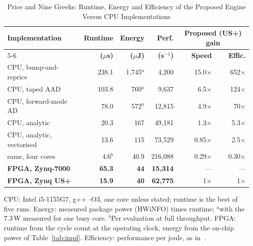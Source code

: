 \documentclass[conference]{IEEEtran}
\begin{document}
\begin{table}[!t]
\centering
\caption{Price and Nine Greeks: Runtime, Energy and Efficiency of the Proposed Engine Versus CPU Implementations}
\label{tab:cpu}
\footnotesize
\setlength{\tabcolsep}{1.8pt}
\begin{tabular}{@{}lrrrrr@{}}
\toprule
\textbf{Implementation} & \textbf{Runtime} & \textbf{Energy} & \textbf{Perf.} & \multicolumn{2}{c}{\textbf{Proposed (US+) gain}}\\
\cmidrule(l){5-6}
& \textbf{($\mu$s)} & \textbf{($\mu$J)} & \textbf{(s$^{-1}$)} & \textbf{Speed} & \textbf{Effic.}\\
\midrule
CPU, bump-and-reprice & 238.1 & 1,745$^{a}$ & 4,200 & 15.0$\times$ & 652$\times$\\
CPU, taped AAD & 103.8 & 760$^{a}$ & 9,637 & 6.5$\times$ & 124$\times$\\
CPU, forward-mode AD & 78.0 & 572$^{a}$ & 12,815 & 4.9$\times$ & 70$\times$\\
CPU, analytic & 20.3 & 167 & 49,181 & 1.3$\times$ & 5.3$\times$\\
CPU, analytic, vectorised & 13.6 & 115 & 73,529 & 0.85$\times$ & 2.5$\times$\\
\quad same, four cores & 4.6$^{b}$ & 40.9 & 216,088 & 0.29$\times$ & 0.30$\times$\\
\midrule
\textbf{FPGA, Zynq-7000} & \textbf{65.3} & \textbf{44} & \textbf{15,314} & --- & ---\\
\textbf{FPGA, Zynq US+} & \textbf{15.9} & \textbf{40} & \textbf{62,775} & 1$\times$ & 1$\times$\\
\bottomrule
\end{tabular}
\par\vspace{2pt}\parbox{\columnwidth}{\scriptsize CPU: Intel i5-1155G7, g++ -O3, one core unless stated; runtime is the best of five runs. Energy: measured package power (HWiNFO) times runtime; $^{a}$with the 7.3\,W measured for one busy core. $^{b}$Per evaluation at full throughput. FPGA: runtime from the cycle count at the operating clock, energy from the on-chip power of Table~\ref{tab:impl}. Efficiency: performance per joule, as in~\cite{klai,klaih2rc}.}
\end{table}





\end{document}
